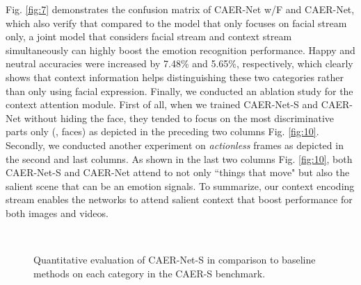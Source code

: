 \documentclass[10pt,twocolumn,letterpaper]{article}
\newcommand{\figref}[1]{Fig. \ref{#1}}
\begin{document}
\figref{fig:7} demonstrates the confusion matrix of CAER-Net w/F and CAER-Net, which also verify that compared to the model that only focuses on facial stream only, a joint model that considers facial stream and context stream simultaneously can highly boost the emotion recognition performance. Happy and neutral accuracies were increased by 7.48\% and 5.65\%, respectively, which clearly shows that context information helps distinguishing these two categories rather than only using facial expression.
Finally, we conducted an ablation study for the context attention module. First of all, when we trained CAER-Net-S and CAER-Net without hiding the face, they tended to focus on the most discriminative parts only (\ie, faces) as depicted in the preceding two columns \figref{fig:10}. Secondly, we conducted another experiment on \emph{actionless} frames as depicted in the second and last columns. As shown in the last two columns \figref{fig:10}, both CAER-Net-S and CAER-Net attend to not only ``things that move" but also the salient scene that can be an emotion signals.
To summarize, our context encoding stream enables the networks to attend salient context that boost performance for both images and videos.



\begin{figure}
	\centering
	\renewcommand{\thesubfigure}{}
	\\
	\vspace{-13pt}
	\caption{Quantitative evaluation of CAER-Net-S in comparison to baseline methods on each category in the CAER-S benchmark.}\vspace{-5pt}\label{fig:8}
\end{figure}
\end{document}

